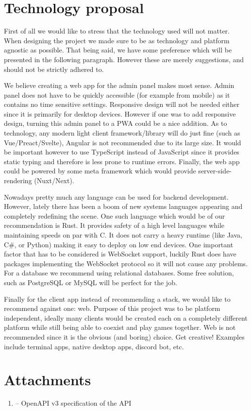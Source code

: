 \documentclass[titlepage]{article}
\begin{document}
\section{Technology proposal}

First of all we would like to stress that the technology used will not matter. When designing the project we made sure to be as technology and platform agnostic as possible. That being said, we have some preference which will be presented in the following paragraph. However these are merely suggestions, and should not be strictly adhered to.

We believe creating a web app for the admin panel makes most sense. Admin panel does not have to be quickly accessible (for example from mobile) as it contains no time sensitive settings. Responsive design will not be needed either since it is primarily for desktop devices. However if one was to add responsive design, turning this admin panel to a PWA could be a nice addition. As to technology, any modern light client framework/library will do just fine (such as Vue/Preact/Svelte), Angular is not recommended due to its large size. It would be important however to use TypeScript instead of JavaScript since it provides static typing and therefore is less prone to runtime errors. Finally, the web app could be powered by some meta framework which would provide server-side-rendering (Nuxt/Next).

Nowadays pretty much any language can be used for backend development. However, lately there has been a boom of new systems languages appearing and completely redefining the scene. One such language which would be of our recommendation is Rust. It provides safety of a high level languages while maintaining speeds on par with C. It does not carry a heavy runtime (like Java, C\#, or Python) making it easy to deploy on low end devices. One important factor that has to be considered is WebSocket support, luckily Rust does have packages implementing the WebSocket protocol so it will not cause any problems. For a database we recommend using relational databases. Some free  solution, such as PostgreSQL or MySQL will be perfect for the job.

Finally for the client app instead of recommending a stack, we would like to recommend against one: web. Purpose of this project was to be platform independent, ideally many clients would be created each on a completely different platform while still being able to coexist and play games together. Web is not recommended since it is the obvious (and boring) choice. Get creative! Examples include terminal apps, native desktop apps, discord bot, etc.

\section{Attachments}

\begin{enumerate}
	\item {} -- OpenAPI v3 specification of the API
\end{enumerate}
\end{document}
